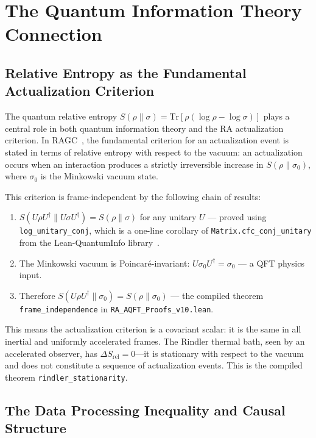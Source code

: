 \documentclass[11pt,a4paper]{article}
\theoremstyle{plain}
\theoremstyle{definition}
\theoremstyle{remark}
\begin{document}
\section{The Quantum Information Theory Connection}
\label{sec:qit}

\subsection{Relative Entropy as the Fundamental Actualization Criterion}

The quantum relative entropy $S(\rho \| \sigma) = \mathrm{Tr}[\rho(\log \rho -
\log \sigma)]$ plays a central role in both quantum information theory and the RA
actualization criterion. In RAGC~\citep{Sandeman2026RAGC}, the fundamental
criterion for an actualization event is stated in terms of relative entropy 
with
respect to the vacuum: an actualization occurs when an interaction produces a
strictly irreversible increase in $S(\rho \| \sigma_0)$, where $\sigma_0$ is the
Minkowski vacuum state.

This criterion is frame-independent by the following chain of results:
\begin{enumerate}[noitemsep]
  \item $S(U\rho U^\dagger \| U\sigma U^\dagger) = S(\rho \| \sigma)$ for any
        unitary $U$ --- proved using \texttt{log\_unitary\_conj}, which is a
        one-line corollary of \texttt{Matrix.cfc\_conj\_unitary} from the
        Lean-QuantumInfo library~\citep{Meiburg2025LQI}.
  \item The Minkowski vacuum is Poincar\'{e}-invariant:
        $U\sigma_0 U^\dagger = \sigma_0$ --- a QFT physics input.
  \item Therefore $S(U\rho U^\dagger \| \sigma_0) = S(\rho \| \sigma_0)$ ---
        the compiled theorem \texttt{frame\_independence} in
        \texttt{RA\_AQFT\_Proofs\_v10.lean}.
\end{enumerate}

This means the actualization criterion is a covariant scalar: it is the same in
all inertial and uniformly accelerated frames. The Rindler thermal bath, seen by
an accelerated observer, has $\Delta S_{\mathrm{rel}} = 0$---it is stationary
with respect to the vacuum and does not constitute a sequence of actualization
events. This is the compiled theorem \texttt{rindler\_stationarity}.

\subsection{The Data Processing Inequality and Causal Structure}
\end{document}
